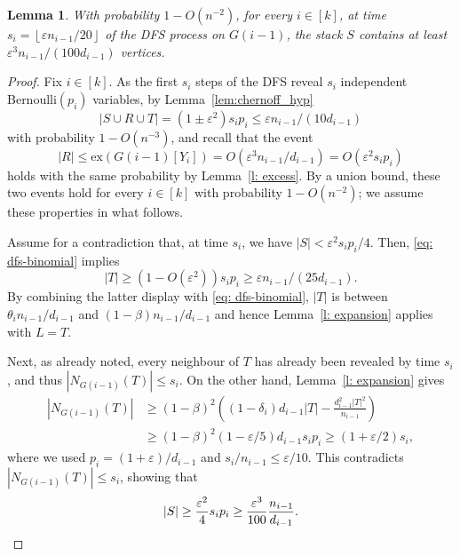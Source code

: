 \documentclass[reqno,a4paper]{amsart}
\newtheorem{lemma}[theorem]{Lemma}
\theoremstyle{definition}
\newcommand{\eps}{\varepsilon}
\newcommand{\ex}{\mathrm{ex}}
\newcommand{\lyu}[1]{{\color{blue} #1}}
\begin{document}
\begin{lemma}\label{lem:long}
With probability $1-O(n^{-2})$, for every $i\in[k]$, at time $s_i=\left\lfloor\eps n_{i-1}/20\right\rfloor$ of the DFS process on $G(i-1)$, the stack $S$ contains at least $\eps^3n_{i-1}/(100d_{i-1})$ vertices.
\end{lemma}

\begin{proof}
Fix $i\in[k]$. 
As the first $s_i$ steps of the DFS reveal $s_i$ independent Bernoulli$(p_i)$ variables, by Lemma~\ref{lem:chernoff_hyp}
\begin{equation}\label{eq: dfs-binomial}
    |S\cup R\cup T|=(1\pm\eps^2)s_ip_i\le \eps n_{i-1}/(10d_{i-1})
\end{equation}
with probability $1-O(n^{-3})$, and recall that the event 
\[|R|\le \ex(G(i-1)[Y_i])=O(\eps^3n_{i-1}/d_{i-1})=O(\eps^2s_ip_i)\]
holds with the same probability by Lemma~\ref{l: excess}. 
By a union bound, these two events hold for every $i\in [k]$ with probability $1-O(n^{-2})$; we assume these properties in what follows.

Assume for a contradiction that, at time $s_i$, we have $|S|<\eps^2 s_ip_i/4$. 
Then, \eqref{eq: dfs-binomial} implies
\[
    |T|\ge (1-O(\eps^2))s_ip_i\ge \eps n_{i-1}/(25d_{i-1}).
\]
By combining the latter display with \eqref{eq: dfs-binomial}, $|T|$ is between $\theta_in_{i-1}/d_{i-1}$ and $(1-\beta)n_{i-1}/d_{i-1}$ and hence Lemma~\ref{l: expansion} applies with $L=T$.

Next, as already noted, every neighbour of $T$ has already been revealed by time $s_i$, and thus $|N_{G(i-1)}(T)|\le s_i$. On the other hand, Lemma~\ref{l: expansion} gives
\begin{align*}
    |N_{G(i-1)}(T)|
    &\ge (1-\beta)^2\left((1-\delta_i)d_{i-1}|T|-\frac{d_{i-1}^2|T|^2}{n_{i-1}}\right)\\
    &\ge (1-\beta)^2(1-\eps/5)d_{i-1} s_ip_i
    \ge (1+\eps/2)s_i,
\end{align*}
where we used $p_i=(1+\eps)/d_{i-1}$ and $s_i/n_{i-1}\le \eps/10$. This contradicts $|N_{G(i-1)}(T)|\le s_i$, showing that
\[
    |S|\ge \frac{\eps^2}{4}s_ip_i\ge \frac{\eps^3}{100}\frac{n_{i-1}}{d_{i-1}}.\qedhere
\]
\end{proof}
\end{document}
